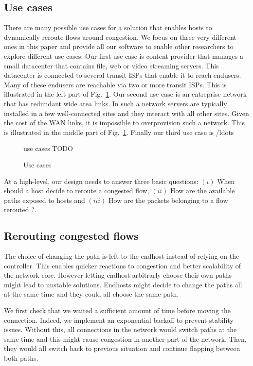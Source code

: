 \subsection{Use cases}

There are many possible use cases for a solution that enables hosts to
dynamically reroute flows around congestion. We focus on three very different
ones in this paper and provide all our software to enable
other researchers to explore different use cases. Our first use case is
content provider that manages a small datacenter that contains file, web
or video streaming servers. This datacenter is connected to several transit
ISPs that enable it to reach endusers. Many of these endusers are reachable
via two or more transit ISPs. This is illustrated in the left part of Fig.~\ref{fig:uc}.
Our second use case is an entreprise network that has redundant wide area links. In such a network servers are typically installed in a few well-connected
sites and they interact with all other sites. Given the cost of the WAN
links, it is impossible to overprovision such a network. This is illustrated in the middle part of Fig.~\ref{fig:uc}. 
Finally our third use case is /ldots



\begin{figure}
	\centering
        use cases TODO
        \caption{Use cases}
	\label{fig:uc}
\end{figure}


At a high-level, our design needs to answer three basic questions: $(i)$ When should a host decide to reroute a congested flow, $(ii)$ How are the available paths exposed to hosts and $(iii)$ How are the packets belonging to a flow rerouted ?.


\subsection{Rerouting congested flows}


The choice of changing the path is left to the endhost instead of relying on the controller.
This enables quicker reactions to congestion and better scalability of the network core.
However letting endhost arbitrarly choose their own paths might lead to unstable solutions.
Endhosts might decide to change the paths all at the same time and they could all choose the same path.

We first check that we waited a sufficient amount of time before moving the connection.
Indeed, we implement an exponential backoff to prevent stability issues. Without this, all connections in the network
would switch paths at the same time and this might cause congestion in another part of the network.
Then, they would all switch back to previous situation and continue flapping between both paths.

